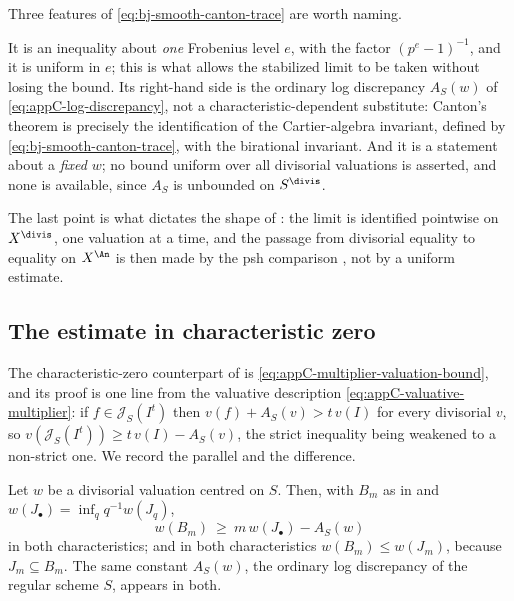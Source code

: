 \begin{remark}
\label{rem:ch40-canton-shape}
Three features of \eqref{eq:bj-smooth-canton-trace} are worth naming.

It is an inequality about \emph{one} Frobenius level $e$, with the factor
$(p^e-1)^{-1}$, and it is uniform in $e$; this is what allows the
stabilized limit to be taken without losing the bound.  Its right-hand side
is the ordinary log discrepancy $A_S(w)$ of \eqref{eq:appC-log-discrepancy},
not a characteristic-dependent substitute: Canton's theorem is precisely the
identification of the Cartier-algebra invariant, defined by
\eqref{eq:bj-smooth-canton-trace}, with the birational invariant.  And it is
a statement about a \emph{fixed} $w$; no bound uniform over all divisorial
valuations is asserted, and none is available, since $A_S$ is unbounded on
$S^{\divis}$.

The last point is what dictates the shape of
: the limit is identified
pointwise on $X^{\divis}$, one valuation at a time, and the passage from
divisorial equality to equality on $X^{\An}$ is then made by the psh
comparison , not by a uniform estimate.
\end{remark}

\subsection{The estimate in characteristic zero}
\label{sec:ch40-multiplier-valuation}

The characteristic-zero counterpart of  is
\eqref{eq:appC-multiplier-valuation-bound}, and its proof is one line from
the valuative description \eqref{eq:appC-valuative-multiplier}: if
$f\in\mathcal J_S(I^t)$ then $v(f)+A_S(v)>t\,v(I)$ for every divisorial
$v$, so $v(\mathcal J_S(I^t))\ge t\,v(I)-A_S(v)$, the strict inequality
being weakened to a non-strict one.  We record the parallel and the
difference.

\begin{lemma}
\label{lem:ch40-valuation-both}
Let $w$ be a divisorial valuation centred on $S$.  Then, with
$B_m$ as in  and
$w(J_\bullet)=\inf_qq^{-1}w(J_q)$,
\[
 w(B_m)\ \ge\ m\,w(J_\bullet)-A_S(w)
\]
in both characteristics; and in both characteristics
$w(B_m)\le w(J_m)$, because $J_m\subseteq B_m$.  The same constant
$A_S(w)$, the ordinary log discrepancy of the regular scheme $S$,
appears in both.
\end{lemma}

